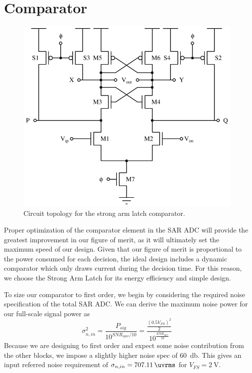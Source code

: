 \documentclass[10pt,journal]{IEEEtran}\usepackage{longtable}
\begin{document}
\section{Comparator}
\begin{figure}[tb]
\begin{center}
\includegraphics[width=1\columnwidth]{StrongArmLatch.pdf}
\caption{Circuit topology for the strong arm latch comparator.}
\label{fig:StrongArmLatch}
\end{center}
\end{figure}
Proper optimization of the comparator element in the SAR ADC will provide the greatest improvement in our figure of merit, as it will ultimately set the maximum speed of our design. Given that our figure of merit is proportional to the power consumed for each decision, the ideal design includes a dynamic comparator which only draws current during the decision time. For this reason, we choose the Strong Arm Latch \cite{Razavi:bp} for its energy efficiency and simple design.

To size our comparator to first order, we begin by considering the required noise specification of the total SAR ADC. We can derive the maximum noise power for our full-scale signal power as
\begin{equation}
\sigma_{n,in}^2=\frac{P_{sig}}{10^{SNR_{spec}/10}}=\frac{\frac{\left(0.5V_{FS}\right)^2}{2}}{10^{\frac{SNR_{spec}}{10}}}
\end{equation}
Because we are designing to first order and expect some noise contribution from the other blocks, we impose a slightly higher noise spec of \SI{60}{\decibel}. This gives an input referred noise requirement of $\sigma_{n,in}=\SI{707.11}{\uvrms}$ for $V_{FS}=\SI{2}{\volt}$.
\end{document}
